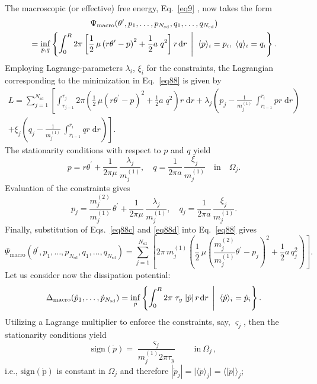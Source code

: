 \documentclass[final,1p,times]{elsarticle}
\newcommand{\be}{\begin{equation}}
\newcommand{\ee}{\end{equation}}
\def\dd{\;\!\mathrm{d}}
\renewcommand{\inf}[3]{
\underset{#1}{\mathrm{inf}}\left\lbrace #2 \; \left| \vphantom{#2}\vphantom{#3} \right. \; #3 \right\rbrace
}
\begin{document}
The macroscopic (or effective) free energy, %
Eq.\ \eqref{eq9} 
, now takes the form
\begin{multline}
\label{eq88}
 \Psi_\mathrm{macro}(\theta^\prime,p_1,\ldots,p_{N_\mathrm{sd}},q_1,\ldots,q_{N_\mathrm{sd}} )  \\
 =\inf{p,q}{\int_{0}^{R} 2\pi \left[ \frac{1}{2}\, \mu \left(r \theta^\prime- p \right)^2 +\frac{1}{2}a\;q^2\right] r \dd r} {\langle p \rangle_i =p_i,\;\langle q \rangle_i=q_i}.
\end{multline}
 Employing Lagrange-parameters $\lambda_i$, $\xi_i$ for the constraints, the Lagrangian corresponding to the minimization in Eq.\ \eqref{eq88} is given by
\begin{multline}
\label{eq88b}
L = \sum_{j=1}^{N_\mathrm{sd}}  \left[
\int_{r_{j-1}}^{r_j} 2\pi \left( \frac{1}{2}\, \mu \left(r \theta^\prime- p \right)^2 +\frac{1}{2}a\;q^2\right) r \dd r + \lambda_j \left( p_j - \frac{1}{m^{(1)}_j} \, \int_{r_{i-1}}^{r_i} p r \dd r \right) \right. \\ \left. + \xi_j \left( q_j - \frac{1}{m^{(1)}_j} \, \int_{r_{i-1}}^{r_i} q r \dd r \right) \right].
\end{multline}
The stationarity conditions with respect to $p$ and $q$ yield
\be
\label{eq88c}
p = r \theta^\prime + \frac{1}{2\pi\mu} \, \frac{\lambda_j}{m^{(1)}_j}, \quad
q = \frac{1}{2\pi a} \, \frac{\xi_j}{m^{(1)}_j} \quad \text{in} \quad \Omega_j.
\ee
Evaluation of the constraints gives
\be
\label{eq88d}
p_j = \frac{m^{(2)}_j}{m^{(1)}_j} \, \theta^\prime + \frac{1}{2\pi\mu} \, \frac{\lambda_j}{m^{(1)}_j}, \quad
q_j = \frac{1}{2\pi a} \, \frac{\xi_j}{m^{(1)}_j}.
\ee
Finally, substitution of Eqs.\ \eqref{eq88c} and \eqref{eq88d} into Eq.\ \eqref{eq88} gives
\be
\label{eq88e}
\Psi_\mathrm{macro}(\theta^\prime,p_1,\ldots,p_{N_\mathrm{sd}},q_1,\ldots,q_{N_\mathrm{sd}} ) 
=\sum_{j=1}^{N_\mathrm{sd}}  \left[
2\pi \, m^{(1)}_j \left( \frac{1}{2}\, \mu \left(\frac{m^{(2)}_j}{m^{(1)}_j} \theta^\prime- p_j \right)^2 +\frac{1}{2}a\, q_j^2\right) \right].
\ee
Let us consider now the dissipation potential:
\be
\label{eq88a}
\Delta_\mathrm{macro}(\dot p_1,\ldots,\dot p_{N_\mathrm{sd}} )  =\inf{\dot p}{\int_{0}^{R} 2\pi \; \tau_y \; \vert \dot p \vert \, r \dd r}{\langle \dot p \rangle_i=\dot p_i}.
\ee
Utilizing a Lagrange multiplier to enforce the constraints, say, $\varsigma_j$, then the stationarity conditions yield
\be
\mathrm{sign}( \dot p ) = \frac{\varsigma_j}{m_j^{(1)} 2\pi \tau_y} \qquad \text{in}~\Omega_j\,,
\ee
i.e., $\mathrm{sign}(\mathrm{\dot{p}})$ is constant in $\Omega_j$ and therefore $|\dot{p}_j| ={\vert\langle \dot p \rangle_j \vert=}\langle |\dot p| \rangle_j$;
\end{document}
